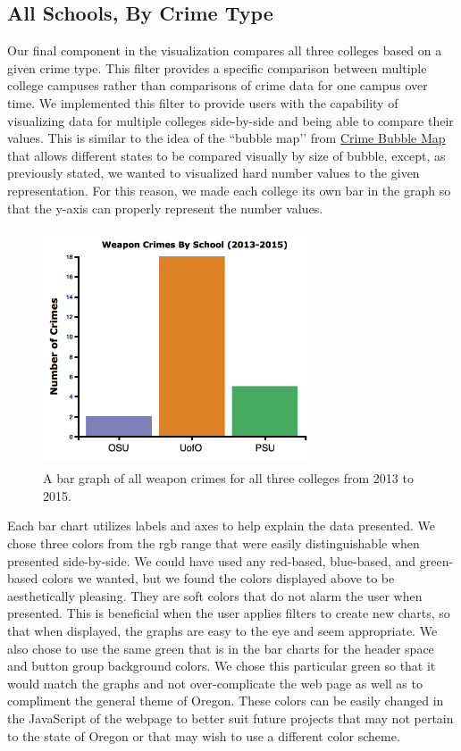 \documentclass[journal]{vgtc}                %
\begin{document}
\subsection{All Schools, By Crime Type}
Our final component in the visualization compares all three colleges based on a given crime type. This filter provides a specific comparison between multiple college campuses rather than comparisons of crime data for one campus over time. We implemented this filter to provide users with the capability of visualizing data for multiple colleges side-by-side and being able to compare their values. This is similar to the idea of the ``bubble map’’ from \href{http://funcvis.org/visuals/crime/#all_states=&crimes=}{Crime Bubble Map} that allows different states to be compared visually by size of bubble, except, as previously stated, we wanted to visualized hard number values to the given representation. For this reason, we made each college its own bar in the graph so that the y-axis can properly represent the number values.
\begin{figure}[H]
\label{fig:AllSchoolsOneType}

\includegraphics[width=8cm, height=7cm]{AllSchoolsOneType}
\caption{A bar graph of all weapon crimes for all three colleges from 2013 to 2015.}
\end{figure}

Each bar chart utilizes labels and axes to help explain the data presented. We chose three colors from the rgb range that were easily distinguishable when presented side-by-side. We could have used any red-based, blue-based, and green-based colors we wanted, but we found the colors displayed above to be aesthetically pleasing. They are soft colors that do not alarm the user when presented. This is beneficial when the user applies filters to create new charts, so that when displayed, the graphs are easy to the eye and seem appropriate. We also chose to use the same green that is in the bar charts for the header space and button group background colors. We chose this particular green so that it would match the graphs and not over-complicate the web page as well as to compliment the general theme of Oregon. These colors can be easily changed in the JavaScript of the webpage to better suit future projects that may not pertain to the state of Oregon or that may wish to use a different color scheme.
\end{document}

